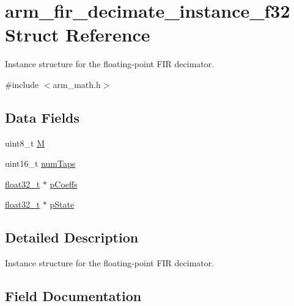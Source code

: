 \hypertarget{structarm__fir__decimate__instance__f32}{}\section{arm\+\_\+fir\+\_\+decimate\+\_\+instance\+\_\+f32 Struct Reference}
\label{structarm__fir__decimate__instance__f32}


Instance structure for the floating-\/point F\+IR decimator.  




{\ttfamily \#include $<$arm\+\_\+math.\+h$>$}

\subsection*{Data Fields}
\begin{DoxyCompactItemize}
\item 
uint8\+\_\+t \mbox{\hyperlink{structarm__fir__decimate__instance__f32_ae2c8107d00d3c9942e7a20fc598edecf}{M}}
\item 
uint16\+\_\+t \mbox{\hyperlink{structarm__fir__decimate__instance__f32_a751941891e47f522a7f5375fe8990aac}{num\+Taps}}
\item 
\mbox{\hyperlink{arm__math_8h_a4611b605e45ab401f02cab15c5e38715}{float32\+\_\+t}} $\ast$ \mbox{\hyperlink{structarm__fir__decimate__instance__f32_aacbb8dd8eeba4b21fc2bb40076405ee3}{p\+Coeffs}}
\item 
\mbox{\hyperlink{arm__math_8h_a4611b605e45ab401f02cab15c5e38715}{float32\+\_\+t}} $\ast$ \mbox{\hyperlink{structarm__fir__decimate__instance__f32_a335c87e6fdc4b96601d95a5de8b9c463}{p\+State}}
\end{DoxyCompactItemize}


\subsection{Detailed Description}
Instance structure for the floating-\/point F\+IR decimator. 

\subsection{Field Documentation}
\mbox{\label{structarm__fir__decimate__instance__f32_ae2c8107d00d3c9942e7a20fc598edecf}} 
